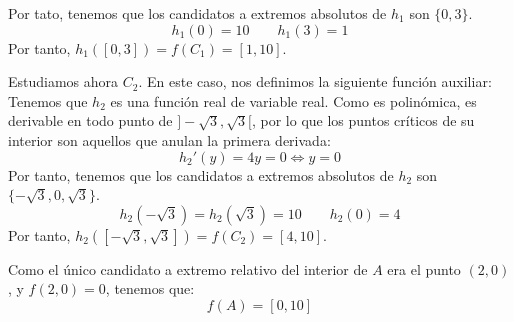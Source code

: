 \begin{ejercicio}
    Por tato, tenemos que los candidatos a extremos absolutos de $h_1$ son $\{0,3\}$.
    \begin{equation*}
        h_1(0)=10 \qquad h_1(3)=1
    \end{equation*}
    Por tanto, $h_1([0,3])=f(C_1) = [1,10]$.


    Estudiamos ahora $C_2$. En este caso, nos definimos la siguiente función auxiliar:
    Tenemos que $h_2$ es una función real de variable real. Como es polinómica, es derivable en todo punto de
    $]-\sqrt{3},\sqrt{3}[$, por lo que los puntos críticos de su interior son aquellos que anulan la primera derivada:
    \begin{equation*}
        h_2'(y) = 4y = 0 \Longleftrightarrow y=0
    \end{equation*}
    Por tanto, tenemos que los candidatos a extremos absolutos de $h_2$ son $\{-\sqrt{3},0,\sqrt{3}\}$.
    \begin{equation*}
        h_2(-\sqrt{3})=h_2(\sqrt{3})=10 \qquad h_2(0)=4
    \end{equation*}
    Por tanto, $h_2([-\sqrt{3},\sqrt{3}])=f(C_2) = [4,10]$.

    Como el único candidato a extremo relativo del interior de $A$ era el punto $(2,0)$, y $f(2,0)=0$, tenemos que:
    \begin{equation*}
        f(A)=[0,10]
    \end{equation*}
\end{ejercicio}

